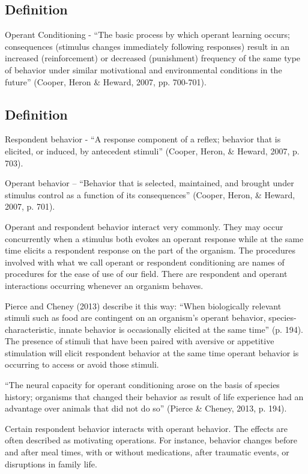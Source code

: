 \subsection{Definition}
Operant Conditioning - ``The basic process by which operant learning occurs; consequences (stimulus changes immediately following responses) result in an increased (reinforcement) or decreased (punishment) frequency of the same type of behavior under similar motivational and environmental conditions in the future'' (Cooper, Heron \& Heward, 2007, pp. 700-701).
%
\subsection{Definition}
Respondent behavior - ``A response component of a reflex; behavior that is elicited, or induced, by antecedent stimuli'' (Cooper, Heron, \& Heward, 2007, p. 703).

Operant behavior – ``Behavior that is selected, maintained, and brought under stimulus control as a function of its consequences'' (Cooper, Heron, \& Heward, 2007, p. 701).

Operant and respondent behavior interact very commonly. They may occur concurrently when a stimulus both evokes an operant response while at the same time elicits a respondent response on the part of the organism. The procedures involved with what we call operant or respondent conditioning are names of procedures for the ease of use of our field. There are respondent and operant interactions occurring whenever an organism behaves. 

Pierce and Cheney (2013) describe it this way: ``When biologically relevant stimuli such as food are contingent on an organism's operant behavior, species-characteristic, innate behavior is occasionally elicited at the same time'' (p. 194). The presence of stimuli that have been paired with aversive or appetitive stimulation will elicit respondent behavior at the same time operant behavior is occurring to access or avoid those stimuli.

``The neural capacity for operant conditioning arose on the basis of species history; organisms that changed their behavior as result of life experience had an advantage over animals that did not do so'' (Pierce \& Cheney, 2013, p. 194).

Certain respondent behavior interacts with operant behavior. The effects are often described as motivating operations. For instance, behavior changes before and after meal times, with or without medications, after traumatic events, or disruptions in family life. 

